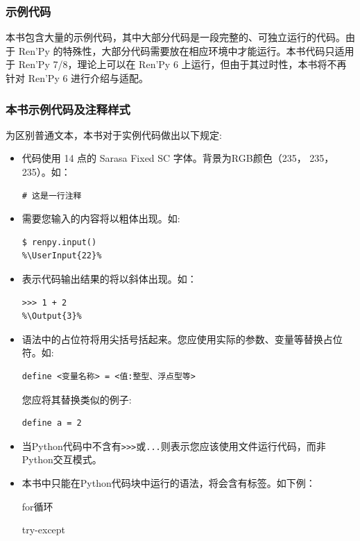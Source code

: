 \documentclass[../Main.tex]{subfiles}
\begin{document}
\subsubsection*{示例代码}
本书包含大量的示例代码，其中大部分代码是一段完整的、可独立运行的代码。由于 Ren'Py 的特殊性，大部分代码需要放在相应环境中才能运行。本书代码只适用于 Ren'Py 7/8，理论上可以在 Ren'Py 6 上运行，但由于其过时性，本书将不再针对 Ren'Py 6 进行介绍与适配。

\subsubsection*{本书示例代码及注释样式}
为区别普通文本，本书对于实例代码做出以下规定:
\begin{itemize}
    \item 代码使用 14 点的 Sarasa Fixed SC 字体。背景为RGB颜色（235， 235， 235）。如：
    \begin{lstlisting}[numbers=none]
# 这是一行注释
    \end{lstlisting}

    \item 需要您输入的内容将以粗体出现。如:
    \begin{lstlisting}
$ renpy.input()
%\UserInput{22}%
    \end{lstlisting}

    \item 表示代码输出结果的将以斜体出现。如：
    \begin{lstlisting}
>>> 1 + 2
%\Output{3}%
    \end{lstlisting}

    \item 语法中的占位符将用尖括号括起来。您应使用实际的参数、变量等替换占位符。如:
    \begin{lstlisting}[numbers=none]
define <变量名称> = <值:整型、浮点型等>
    \end{lstlisting}
    您应将其替换类似的例子:
    \begin{lstlisting}[numbers=none]
define a = 2
    \end{lstlisting}

    \item 当Python代码中不含有\verb|>>>|或\verb|...|则表示您应该使用文件运行代码，而非Python交互模式。

    \item 本书中只能在Python代码块中运行的语法，将会含有\PyOnly 标签。如下例：


    for循环 \PyOnly
    
    try-except \PyOnly



\end{itemize}
\end{document}

